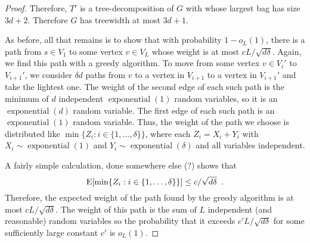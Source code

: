 \documentclass[lotsofwhite]{patmorin}
\DeclareMathOperator{\exponential}{exponential}
\begin{document}
\begin{proof}
  Therefore, $T'$ is a tree-decomposition of $G$ with whose largest bag
  has size $3d+2$.  Therefore $G$ has treewidth at most $3d+1$.

  As before, all that remains is to show that with probability
  $1-o_L(1)$, there is a path from $s\in V_1$ to some vertex $v\in
  V_{L}$ whose weight is at most $cL/\sqrt{d\delta}$.  Again, we
  find this path with a greedy algorithm.  To move from some vertex
  $v\in V_i'$ to $V_{i+1}'$, we consider $\delta d$ paths from $v$ to a
  vertex in $V_{i+1}$ to a vertex in $V_{i+1}'$ and take the lightest one.
  The weight of the second edge of each such path is the minimum of
  $d$ independent $\exponential(1)$ random variables, so it is an
  $\exponential(d)$ random variable.  The first edge of each such
  path is an $\exponential(1)$ random variable.  Thus, the weight of the
  path we choose is distributed like $\min\{Z_i:i\in\{1,\ldots,\delta\}\}$,
  where each $Z_i=X_i+Y_i$ with $X_i\sim
  \exponential(1)$ and $Y_i\sim\exponential(\delta)$ and all variables
  independent.

  A fairly simple calculation, done somewhere else (?) shows that
  \[
      \mathrm{E}[\min\{Z_i:i\in\{1,\ldots,\delta\}\}] \le c/\sqrt{d\delta} \enspace .
  \]
  Therefore, the expected weight of the path found by the greedy algorithm
  is at most $cL/\sqrt{d\delta}$.  The weight of this path is the sum
  of $L$ independent (and reasonable) random variables so the probability
  that it exceeds $c'L/\sqrt{d\delta}$ for some sufficiently large constant
  $c'$ is $o_L(1)$.
\end{proof}

 
\end{document}

